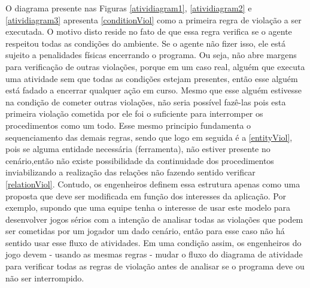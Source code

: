 O diagrama presente nas Figuras \ref{atividiagram1}, \ref{atividiagram2} e \ref{atividiagram3} apresenta \ref{conditionViol} como a primeira regra de violação a ser executada. O motivo disto reside no fato de que essa regra verifica se o agente respeitou todas as condições do ambiente. Se o agente não fizer isso, ele está sujeito a penalidades físicas encerrando o programa. Ou seja, não abre margens para verificação de outras violações, porque em um caso real, alguém que executa uma atividade sem que todas as condições estejam presentes, então esse alguém está fadado a encerrar qualquer ação em curso. Mesmo que esse alguém estivesse na condição de cometer outras violações, não seria possível fazê-las pois esta primeira violação cometida por ele foi o suficiente para interromper os procedimentos como um todo. Esse mesmo principio fundamenta o sequenciamento das demais regras, sendo que logo em seguida é a \ref{entityViol}, pois se alguma entidade  necessária (ferramenta), não estiver presente no cenário,então não existe possibilidade da continuidade dos procedimentos inviabilizando a realização das relações não fazendo sentido verificar \ref{relationViol}. Contudo, os engenheiros definem essa estrutura apenas como uma proposta que deve ser modificada em função dos interesses da aplicação. Por exemplo, supondo que uma equipe tenha o interesse de usar este modelo para desenvolver jogos sérios com a intenção de analisar todas as violações que podem ser cometidas por um jogador um dado cenário, então para esse caso não há sentido usar esse fluxo de atividades. Em uma condição assim, os engenheiros do jogo devem - usando as mesmas regras - mudar o fluxo do diagrama de atividade para verificar todas as regras de violação antes de analisar se o programa deve ou não ser interrompido.